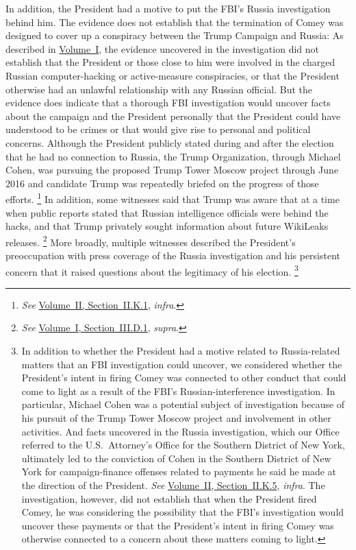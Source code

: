 In addition, the President had a motive to put the FBI's Russia investigation behind him.
The evidence does not establish that the termination of Comey was designed to cover up a conspiracy between the Trump Campaign and Russia: As described in \hyperlink{chapter.1}{Volume~I}, the evidence uncovered in the investigation did not establish that the President or those close to him were involved in the charged Russian computer-hacking or active-measure conspiracies, or that the President otherwise had an unlawful relationship with any Russian official.
But the evidence does indicate that a thorough FBI investigation would uncover facts about the campaign and the President personally that the President could have understood to be crimes or that would give rise to personal and political concerns.
Although the President publicly stated during and after the election that he had no connection to Russia, the Trump Organization, through Michael Cohen, was pursuing the proposed Trump Tower Moscow project through June 2016 and candidate Trump was repeatedly briefed on the progress of those efforts.%
\footnote{\textit{See} \hyperlink{subsubsection.2.2.11.1}{Volume~II, Section~II.K.1}, \textit{infra}.}
In addition, some witnesses said that Trump was aware that 
at a time when public reports stated that Russian intelligence officials were behind the hacks, and that Trump privately sought information about future WikiLeaks releases.%
\footnote{\textit{See} \hyperlink{subsubsection.1.3.4.1}{Volume~I, Section~III.D.1}, \textit{supra}.}
More broadly, multiple witnesses described the President's preoccupation with press coverage of the Russia investigation and his persistent concern that it raised questions about the legitimacy of his election.%
\footnote{In addition to whether the President had a motive related to Russia-related matters that an FBI investigation could uncover, we considered whether the President's intent in firing Comey was connected to other conduct that could come to light as a result of the FBI's Russian-interference investigation.
In particular, Michael Cohen was a potential subject of investigation because of his pursuit of the Trump Tower Moscow project and involvement in other activities.
And facts uncovered in the Russia investigation, which our Office referred to the U.S.~Attorney's Office for the Southern District of New York, ultimately led to the conviction of Cohen in the Southern District of New York for campaign-finance offenses related to payments he said he made at the direction of the President.
\textit{See} \hyperlink{subsubsection.2.2.11.5}{Volume~II, Section~II.K.5}, \textit{infra}.
The investigation, however, did not establish that when the President fired Comey, he was considering the possibility that the FBI's investigation would uncover these payments or that the President's intent in firing Comey was otherwise connected to a concern about these matters coming to light.}

